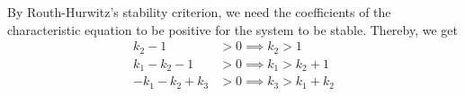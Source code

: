 By Routh-Hurwitz's stability criterion, we need the coefficients of the characteristic equation to be positive for the system to be stable.
Thereby, we get
\begin{align*}
    k_2 - 1          & > 0 \implies k_2 > 1
    \\
    k_1 - k_2 - 1    & > 0 \implies k_1 > k_2 + 1
    \\
    -k_1 - k_2 + k_3 & > 0 \implies k_3 > k_1 + k_2
\end{align*}

